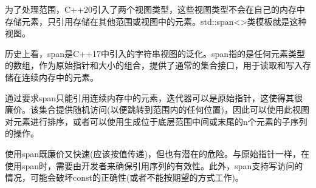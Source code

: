 为了处理范围，C++20引入了两个视图类型，这些视图类型不会在自己的内存中存储元素，只引用存储在其他范围或视图中的元素。std::span<>类模板就是这种视图。

历史上看，span是C++17中引入的字符串视图的泛化。span指的是任何元素类型的数组，作为原始指针和大小的组合，提供了通常的集合接口，用于读取和写入存储在连续内存中的元素。

通过要求span只能引用连续内存中的元素，迭代器可以是原始指针，这使得其很廉价。该集合提供随机访问(以便跳转到范围内的任何位置)，因此可以使用此视图对元素进行排序，或者可以使用生成位于底层范围中间或末尾的n个元素的子序列的操作。

使用span既廉价又快速(应该按值传递)，但也有潜在的危险。与原始指针一样，在使用span时，需要由开发者来确保引用序列的有效性。此外，span支持写访问的情况，可能会破坏const的正确性(或者不能按期望的方式工作)。